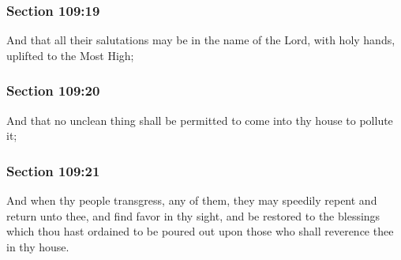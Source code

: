 
	\subsubsection{Section 109:19} %
		\label{DC109-19}

		And that all their salutations may be in the name of the Lord, with holy hands, uplifted to the Most High;


	\subsubsection{Section 109:20} %
		\label{DC109-20}

		And that no unclean thing shall be permitted to come into thy house to pollute it;


	\subsubsection{Section 109:21} %
		\label{DC109-21}

		And when thy people transgress, any of them, they may speedily repent and return unto thee, and find favor in thy sight, and be restored to the blessings which thou hast ordained to be poured out upon those who shall reverence thee in thy house.


